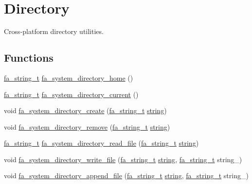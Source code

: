 \hypertarget{group___fa_system_directory}{\section{Directory}
\label{group___fa_system_directory}
}


Cross-\/platform directory utilities.  


\subsection*{Functions}
\begin{DoxyCompactItemize}
\item 
\hyperlink{group___fa_string_gacada63033b77bc6c39fa632ae199349b}{fa\-\_\-string\-\_\-t} \hyperlink{group___fa_system_directory_ga6897f00485acd18599c8f4205b178eb4}{fa\-\_\-system\-\_\-directory\-\_\-home} ()
\item 
\hyperlink{group___fa_string_gacada63033b77bc6c39fa632ae199349b}{fa\-\_\-string\-\_\-t} \hyperlink{group___fa_system_directory_ga73e2bc30ca0f998629a0414aea4e9b1f}{fa\-\_\-system\-\_\-directory\-\_\-current} ()
\item 
void \hyperlink{group___fa_system_directory_gaee4c95bcfcd7047ff3f870e7f2331f29}{fa\-\_\-system\-\_\-directory\-\_\-create} (\hyperlink{group___fa_string_gacada63033b77bc6c39fa632ae199349b}{fa\-\_\-string\-\_\-t} \hyperlink{util_8h_a41106000aac73b61e4fc2ef9dd39a603}{string})
\item 
void \hyperlink{group___fa_system_directory_ga1e998e91732aaad5507a41ed36ff4dc9}{fa\-\_\-system\-\_\-directory\-\_\-remove} (\hyperlink{group___fa_string_gacada63033b77bc6c39fa632ae199349b}{fa\-\_\-string\-\_\-t} \hyperlink{util_8h_a41106000aac73b61e4fc2ef9dd39a603}{string})
\item 
\hyperlink{group___fa_string_gacada63033b77bc6c39fa632ae199349b}{fa\-\_\-string\-\_\-t} \hyperlink{group___fa_system_directory_ga9197a6a653a0a1aa13db7293cd113383}{fa\-\_\-system\-\_\-directory\-\_\-read\-\_\-file} (\hyperlink{group___fa_string_gacada63033b77bc6c39fa632ae199349b}{fa\-\_\-string\-\_\-t} \hyperlink{util_8h_a41106000aac73b61e4fc2ef9dd39a603}{string})
\item 
void \hyperlink{group___fa_system_directory_ga1ed8bd6b0949d4ed76d1dcfae81ad5e0}{fa\-\_\-system\-\_\-directory\-\_\-write\-\_\-file} (\hyperlink{group___fa_string_gacada63033b77bc6c39fa632ae199349b}{fa\-\_\-string\-\_\-t} \hyperlink{util_8h_a41106000aac73b61e4fc2ef9dd39a603}{string}, \hyperlink{group___fa_string_gacada63033b77bc6c39fa632ae199349b}{fa\-\_\-string\-\_\-t} string\-\_\-)
\item 
void \hyperlink{group___fa_system_directory_ga9466820d5fcc5878a44fb8adc1c28716}{fa\-\_\-system\-\_\-directory\-\_\-append\-\_\-file} (\hyperlink{group___fa_string_gacada63033b77bc6c39fa632ae199349b}{fa\-\_\-string\-\_\-t} \hyperlink{util_8h_a41106000aac73b61e4fc2ef9dd39a603}{string}, \hyperlink{group___fa_string_gacada63033b77bc6c39fa632ae199349b}{fa\-\_\-string\-\_\-t} string\-\_\-)
\end{DoxyCompactItemize}


